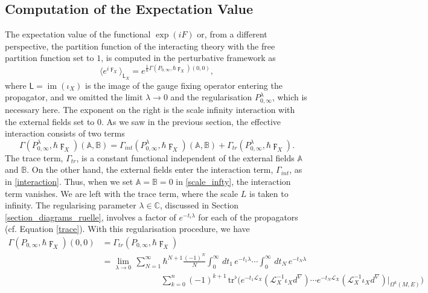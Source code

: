 \documentclass[reqno]{amsart}
\theoremstyle{definition}
\theoremstyle{remark}
\newcommand{\A}{\mathbb{A}}
\newcommand{\B}{\mathbb{B}}
\renewcommand{\d}{d^\nabla}
\newcommand{\h}{\hbar}
\newcommand{\sfL}{\mathsf{L}}
\renewcommand{\L}{\mathcal{L}}
\newcommand{\tr}{\mathrm{tr}^\flat}
\DeclareMathOperator{\im}{im}
\begin{document}
\subsection{Computation of the Expectation Value}
\label{section_expectation}

The expectation value of the functional $\exp(iF)$ or, from a different perspective, the partition function of the interacting theory with the free partition function set to $1$, is computed in the perturbative framework as
$$\biggl\langle e^{i\digamma_X} \biggr\rangle_{\sfL_X} = e^{\frac{1}{\h}\Gamma(P_{0,\infty}, \h \digamma_X)(0,0)},$$
where $\sfL=\im(\iota_X)$ is the image of the gauge fixing operator entering the propagator, and we omitted the limit $\lambda\to 0$ and the regularisation $P_{0,\infty}^\lambda$, which is necessary here. The exponent on the right is the scale infinity interaction with the external fields set to $0$. As we saw in the previous section, the effective interaction consists of two terms
\begin{equation}
\label{scale_infty}
    \Gamma(P^\lambda_{0,\infty}, \h \digamma_X)(\A,\B) = \Gamma_{int}(P^\lambda_{0,\infty}, \h \digamma_X)(\A,\B) + \Gamma_{tr}(P^\lambda_{0,\infty}, \h \digamma_X).
\end{equation}
The trace term, $\Gamma_{tr}$, is a constant functional independent of the external fields $\A$ and $\B$. On the other hand, the external fields enter the interaction term, $\Gamma_{int}$, as in \eqref{interaction}. Thus, when we set $\A=\B=0$ in \eqref{scale_infty}, the interaction term vanishes. We are left with the trace term, where the scale $L$ is taken to infinity. The regularising parameter $\lambda \in \mathbb{C}$, discussed in Section \ref{section_diagrams_ruelle}, involves a factor of $e^{-t_i\lambda}$ for each of the propagators (cf. Equation \eqref{trace}). With this regularisation procedure, we have
\begin{equation}
\label{expectation1}
\begin{split}
    \Gamma(P_{0,\infty}, \h \digamma_X)(0,0) &= \Gamma_{tr}(P_{0,\infty},\h \digamma_X) \\
    &= \lim_{\lambda\to 0}\, \sum_{N=1}^\infty  \h^{N+1}\frac{(-1)^N}{N} \int_0^\infty\,dt_1\,e^{-t_1\lambda}\cdots\int_0^\infty\,dt_N\,e^{-t_N\lambda} \\
    &\hspace{7em} \sum_{k=0}^n (-1)^{k+1}\, \tr\big(e^{-t_1\L_X} (\L_X^{-1}\iota_X\d) \cdots e^{-t_N\L_X} (\L_X^{-1}\iota_X\d)\big|_{\Omega^k(M,E)}\big)
\end{split}
\end{equation}
\end{document}
